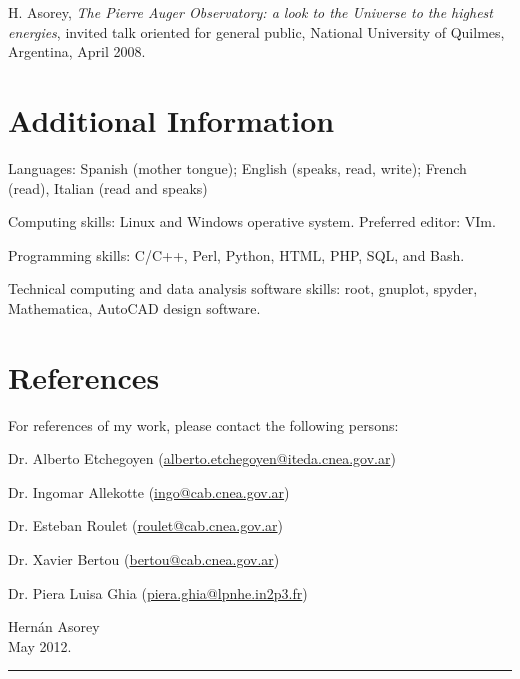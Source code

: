 \documentclass[11pt, a4paper]{article}
\newcommand{\years}[1]{\marginnote{\scriptsize #1}}
\renewenvironment{itemize}{
  \begin{list}{}{
    \setlength{\leftmargin}{0em}
    \setlength{\itemsep}{0.25em}
    \setlength{\parskip}{0pt}
    \setlength{\parsep}{.250em}
  }
}{
  \end{list}
}
\begin{document}
\years{2008}H. Asorey, {\emph{The Pierre Auger Observatory: a look to the
Universe to the highest energies}}, invited talk oriented for general public,
National University of Quilmes, Argentina, April 2008.

\section*{Additional Information}

\begin{itemize}
\item Languages: Spanish (mother tongue); English (speaks, read, write); French
(read), Italian (read and speaks)
\item Computing skills: Linux and Windows operative system. Preferred editor:
VIm.
\item Programming skills: C/C++, Perl, Python, HTML, PHP, SQL, and Bash.
\item Technical computing and data analysis software skills: root, gnuplot,
spyder, Mathematica, AutoCAD design software.
\end{itemize}

\section*{References}

For references of my work, please contact the following persons:

Dr. Alberto Etchegoyen (\href{mailto:alberto.etchegoyen@iteda.cnea.gov.ar}{alberto.etchegoyen@iteda.cnea.gov.ar})

Dr. Ingomar Allekotte (\href{mailto:ingo@cab.cnea.gov.ar}{ingo@cab.cnea.gov.ar})

Dr. Esteban Roulet (\href{mailto:roulet@cab.cnea.gov.ar}{roulet@cab.cnea.gov.ar})

Dr. Xavier Bertou (\href{mailto:bertou@cab.cnea.gov.ar}{bertou@cab.cnea.gov.ar})

Dr. Piera Luisa Ghia (\href{mailto:piera.ghia@lpnhe.in2p3.fr}{piera.ghia@lpnhe.in2p3.fr})

\vspace{2cm}
\begin{flushright}
Hernán Asorey\\
May 2012.
\end{flushright}
\hrule
\end{document}
